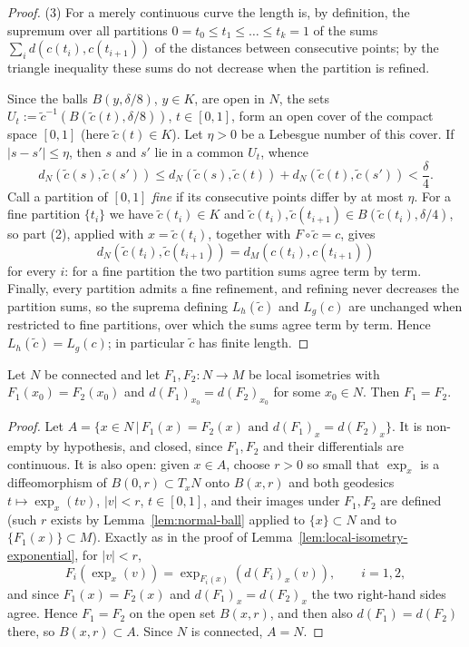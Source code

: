 \begin{proof}
(3) For a merely continuous curve the length is, by definition,
the supremum over all partitions $0=t_0\le t_1\le\dots\le t_k=1$
of the sums $\sum_i d\left(c(t_i),c(t_{i+1})\right)$ of the
distances between consecutive points; by the triangle inequality
these sums do not decrease when the partition is refined.

Since the balls $B(y,\delta/8)$, $y\in K$, are open in $N$, the
sets $U_t:=\tilde c^{-1}\left(B(\tilde c(t),\delta/8)\right)$,
$t\in[0,1]$, form an open cover of the compact space $[0,1]$
(here $\tilde c(t)\in K$). Let $\eta>0$ be a Lebesgue number of
this cover. If $|s-s'|\le\eta$, then $s$ and $s'$ lie in a common
$U_t$, whence
$$d_N\left(\tilde c(s),\tilde c(s')\right)\le
d_N\left(\tilde c(s),\tilde c(t)\right)
+d_N\left(\tilde c(t),\tilde c(s')\right)<\frac{\delta}{4}.$$
Call a partition of $[0,1]$ \emph{fine} if its consecutive points
differ by at most $\eta$. For a fine partition $\{t_i\}$ we have
$\tilde c(t_i)\in K$ and
$\tilde c(t_i),\tilde c(t_{i+1})\in B(\tilde c(t_i),\delta/4)$, so
part (2), applied with $x=\tilde c(t_i)$, together with
$F\circ\tilde c=c$, gives
$$d_N\left(\tilde c(t_i),\tilde c(t_{i+1})\right)
=d_M\left(c(t_i),c(t_{i+1})\right)$$
for every $i$: for a fine partition the two partition sums agree
term by term. Finally, every partition admits a fine refinement,
and refining never decreases the partition sums, so the suprema
defining $L_h(\tilde c)$ and $L_g(c)$ are unchanged when
restricted to fine partitions, over which the sums agree term by
term. Hence $L_h(\tilde c)=L_g(c)$; in particular $\tilde c$ has
finite length.
\end{proof}

\begin{lemma}
\label{lem:local-isometry-rigidity}
Let $N$ be connected and let $F_1,F_2\colon N\to M$ be local
isometries with $F_1(x_0)=F_2(x_0)$ and $d(F_1)_{x_0}=d(F_2)_{x_0}$
for some $x_0\in N$. Then $F_1=F_2$.
\end{lemma}

\begin{proof}
Let $A=\{x\in N\,|\, F_1(x)=F_2(x)\text{ and }
d(F_1)_x=d(F_2)_x\}$. It is non-empty by hypothesis, and closed,
since $F_1,F_2$ and their differentials are continuous. It is also
open: given $x\in A$, choose $r>0$ so small that $\exp_x$ is a
diffeomorphism of $B(0,r)\subset T_xN$ onto $B(x,r)$ and both
geodesics $t\mapsto\exp_x(tv)$, $|v|<r$, $t\in[0,1]$, and their
images under $F_1,F_2$ are defined (such $r$ exists by
Lemma~\ref{lem:normal-ball} applied to $\{x\}\subset N$ and to
$\{F_1(x)\}\subset M$). Exactly as in the proof of
Lemma~\ref{lem:local-isometry-exponential}, for $|v|<r$,
$$F_i\left(\exp_x(v)\right)=\exp_{F_i(x)}\left(d(F_i)_x
(v)\right),\qquad i=1,2,$$
and since $F_1(x)=F_2(x)$ and $d(F_1)_x=d(F_2)_x$ the two right-hand
sides agree. Hence $F_1=F_2$ on the open set $B(x,r)$, and then also
$d(F_1)=d(F_2)$ there, so $B(x,r)\subset A$. Since $N$ is connected,
$A=N$.
\end{proof}

